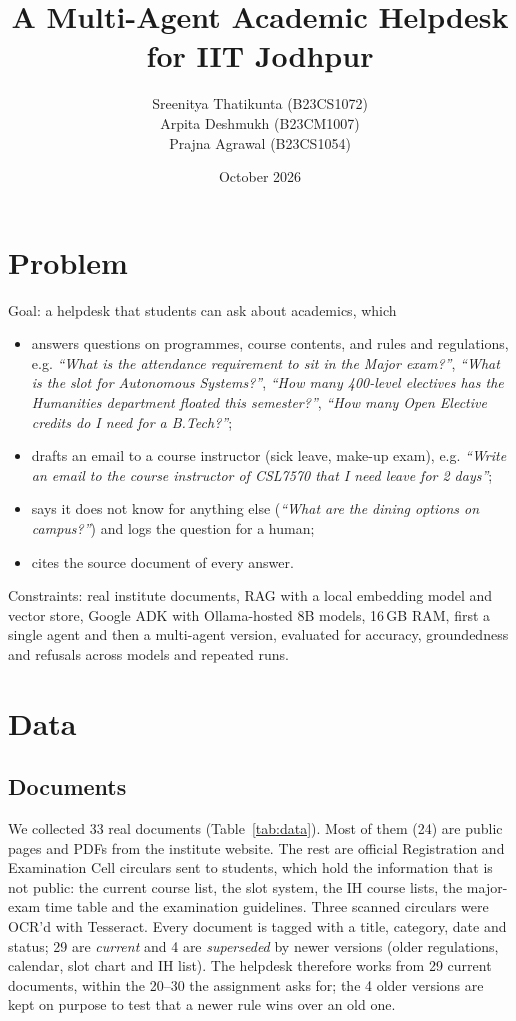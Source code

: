 \documentclass[10pt,a4paper]{article}
\title{\textbf{A Multi-Agent Academic Helpdesk for IIT Jodhpur}}
\author{Sreenitya Thatikunta (B23CS1072)\\ Arpita Deshmukh (B23CM1007)\\ Prajna Agrawal (B23CS1054)}
\date{October 2026}
\begin{document}
\maketitle

\section{Problem}
Goal: a helpdesk that students can ask about academics, which
\begin{itemize}
\item answers questions on programmes, course contents, and rules and regulations, e.g.
  \emph{``What is the attendance requirement to sit in the Major exam?''},
  \emph{``What is the slot for Autonomous Systems?''},
  \emph{``How many 400-level electives has the Humanities department floated this semester?''},
  \emph{``How many Open Elective credits do I need for a B.Tech?''};
\item drafts an email to a course instructor (sick leave, make-up exam), e.g.
  \emph{``Write an email to the course instructor of CSL7570 that I need leave for 2 days''};
\item says it does not know for anything else (\emph{``What are the dining options on campus?''}) and logs
  the question for a human;
\item cites the source document of every answer.
\end{itemize}
Constraints: real institute documents, RAG with a local embedding model and vector store, Google ADK with
Ollama-hosted 8B models, 16\,GB RAM, first a single agent and then a multi-agent version, evaluated for accuracy,
groundedness and refusals across models and repeated runs.

\section{Data}
\subsection{Documents}
We collected 33 real documents (Table~\ref{tab:data}). Most of them (24) are public pages and PDFs from the
institute website. The rest are official Registration and Examination Cell circulars sent to students, which
hold the information that is not public: the current course list, the slot system, the IH course lists, the
major-exam time table and the examination guidelines. Three scanned circulars were OCR'd with Tesseract.
Every document is tagged with a title, category, date and status; 29 are \emph{current} and 4 are
\emph{superseded} by newer versions (older regulations, calendar, slot chart and IH list). The helpdesk therefore
works from 29 current documents, within the 20--30 the assignment asks for; the 4 older versions are kept on purpose
to test that a newer rule wins over an old one.
\end{document}
